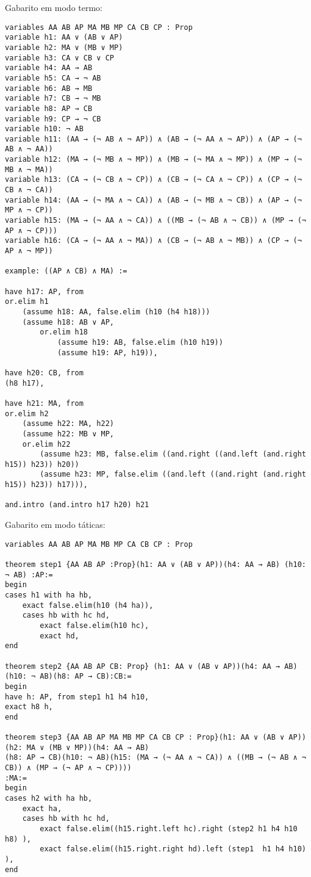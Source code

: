 \begin{enumerate}
Gabarito em modo termo:
\begin{lstlisting}
variables AA AB AP MA MB MP CA CB CP : Prop 
variable h1: AA ∨ (AB ∨ AP)
variable h2: MA ∨ (MB ∨ MP)
variable h3: CA ∨ CB ∨ CP
variable h4: AA → AB
variable h5: CA → ¬ AB
variable h6: AB → MB
variable h7: CB → ¬ MB
variable h8: AP → CB
variable h9: CP → ¬ CB
variable h10: ¬ AB
variable h11: (AA → (¬ AB ∧ ¬ AP)) ∧ (AB → (¬ AA ∧ ¬ AP)) ∧ (AP → (¬ AB ∧ ¬ AA))
variable h12: (MA → (¬ MB ∧ ¬ MP)) ∧ (MB → (¬ MA ∧ ¬ MP)) ∧ (MP → (¬ MB ∧ ¬ MA))
variable h13: (CA → (¬ CB ∧ ¬ CP)) ∧ (CB → (¬ CA ∧ ¬ CP)) ∧ (CP → (¬ CB ∧ ¬ CA))
variable h14: (AA → (¬ MA ∧ ¬ CA)) ∧ (AB → (¬ MB ∧ ¬ CB)) ∧ (AP → (¬ MP ∧ ¬ CP))
variable h15: (MA → (¬ AA ∧ ¬ CA)) ∧ ((MB → (¬ AB ∧ ¬ CB)) ∧ (MP → (¬ AP ∧ ¬ CP)))
variable h16: (CA → (¬ AA ∧ ¬ MA)) ∧ (CB → (¬ AB ∧ ¬ MB)) ∧ (CP → (¬ AP ∧ ¬ MP))

example: ((AP ∧ CB) ∧ MA) :=

have h17: AP, from 
or.elim h1
    (assume h18: AA, false.elim (h10 (h4 h18)))
    (assume h18: AB ∨ AP,
        or.elim h18
            (assume h19: AB, false.elim (h10 h19))
            (assume h19: AP, h19)),

have h20: CB, from 
(h8 h17),

have h21: MA, from 
or.elim h2
    (assume h22: MA, h22)
    (assume h22: MB ∨ MP,
    or.elim h22
        (assume h23: MB, false.elim ((and.right ((and.left (and.right h15)) h23)) h20))
        (assume h23: MP, false.elim ((and.left ((and.right (and.right h15)) h23)) h17))),

and.intro (and.intro h17 h20) h21
\end{lstlisting}
\bigbreak
Gabarito em modo táticas:
\begin{lstlisting}
variables AA AB AP MA MB MP CA CB CP : Prop

theorem step1 {AA AB AP :Prop}(h1: AA ∨ (AB ∨ AP))(h4: AA → AB) (h10: ¬ AB) :AP:=
begin
cases h1 with ha hb,
    exact false.elim(h10 (h4 ha)),
    cases hb with hc hd,
        exact false.elim(h10 hc),
        exact hd,
end

theorem step2 {AA AB AP CB: Prop} (h1: AA ∨ (AB ∨ AP))(h4: AA → AB) (h10: ¬ AB)(h8: AP → CB):CB:=
begin
have h: AP, from step1 h1 h4 h10,
exact h8 h,
end

theorem step3 {AA AB AP MA MB MP CA CB CP : Prop}(h1: AA ∨ (AB ∨ AP))(h2: MA ∨ (MB ∨ MP))(h4: AA → AB)
(h8: AP → CB)(h10: ¬ AB)(h15: (MA → (¬ AA ∧ ¬ CA)) ∧ ((MB → (¬ AB ∧ ¬ CB)) ∧ (MP → (¬ AP ∧ ¬ CP))))
:MA:=
begin
cases h2 with ha hb,
    exact ha,
    cases hb with hc hd,
        exact false.elim((h15.right.left hc).right (step2 h1 h4 h10 h8) ),
        exact false.elim((h15.right.right hd).left (step1  h1 h4 h10) ),            
end


\end{lstlisting}
\end{enumerate}
